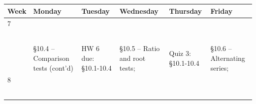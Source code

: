 \documentclass[11pt]{article}
\begin{document}
\begin{table}[ht!]
{\RaggedRight
\begin{tabular}{ | l | l | l | l | l | l |}
\hline
{Week} & {Monday} & {Tuesday} & {Wednesday} & {Thursday} & {Friday} \\
\hline
7 & \begin{minipage}{0.18\textwidth}
{\bf June 28}\\
\end{minipage}
& \begin{minipage}{.18\textwidth}
{\bf June 29}\\
\end{minipage}
& \begin{minipage}{.18\textwidth}
{\bf June 30}\\
\end{minipage}
& \begin{minipage}{.18\textwidth}
{\bf July 1}\\
\end{minipage}
& \begin{minipage}{.18\textwidth}
{\bf July 2}\\
\end{minipage}\\

 & \begin{minipage}{0.18\textwidth}
\S 10.4 -- Comparison tests (cont'd)
\end{minipage}
& \begin{minipage}{.18\textwidth}
HW 6 due: \S 10.1-10.4
\end{minipage}
& \begin{minipage}{.18\textwidth}
\S 10.5 -- Ratio and root tests;
\end{minipage}
& \begin{minipage}{.18\textwidth}
Quiz 3: \S10.1-10.4
\end{minipage}
& \begin{minipage}{.18\textwidth}
\S10.6 -- Alternating series;
\end{minipage}\\
\hline

8 & \begin{minipage}{0.18\textwidth}
{\bf July 5}\\
\end{minipage}
& \begin{minipage}{.18\textwidth}
{\bf July 6}\\
\end{minipage}
& \begin{minipage}{.18\textwidth}
{\bf July 7}\\
\end{minipage}
& \begin{minipage}{.18\textwidth}
{\bf July 8}\\
\end{minipage}
& \begin{minipage}{.18\textwidth}
{\bf July 9}\\
\end{minipage}\\


\end{tabular}}
\end{table}
\end{document}
